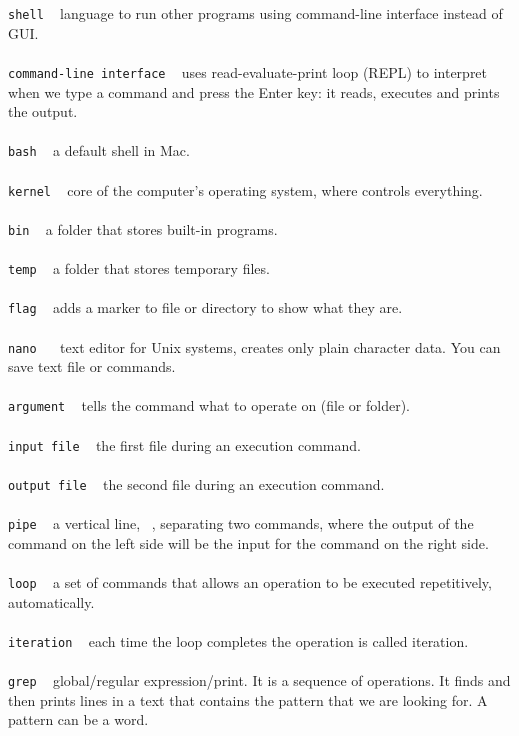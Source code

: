 \documentclass{article}
\begin{document}
\texttt{shell} ~ language to run other programs using command-line interface instead of GUI.\\
\\
\texttt{command-line interface} ~ uses read-evaluate-print loop (REPL) to interpret when we type a command and press the Enter key: it reads, executes and prints the output.\\
\\
\texttt{bash} ~	a default shell in Mac.\\
\\
\texttt{kernel} ~ core of the computer's operating system, where controls everything. \\
\\
\texttt{bin} ~ a folder that stores built-in programs.\\
\\
\texttt{temp} ~ a folder that stores temporary files.\\
\\
\texttt{flag} ~ adds a marker to file or directory to show what they are.\\
\\
\texttt{nano	} ~	text editor for Unix systems, creates only plain character data. You can save text file or commands. \\
\\
\texttt{argument} ~	tells the command what to operate on (file or folder).\\
\\
\texttt{input file} ~ the first file during an execution command. \\
\\
\texttt{output file} ~ the second file during an execution command.\\
\\
\texttt{pipe} ~ a vertical line,  \textpipe ~, separating two commands, where the output of the command on the left side will be the input for the command on the right side.\\
\\
\texttt{loop} ~ a set of commands that allows an operation to be executed repetitively, automatically.\\
\\
\texttt{iteration} ~ each time the loop completes the operation is called iteration.\\  
\\
\texttt{grep} ~ global/regular expression/print. It is a sequence of operations. It finds and then prints lines in a text that contains the pattern that we are looking for. A pattern can be a word.\\
\end{document}
